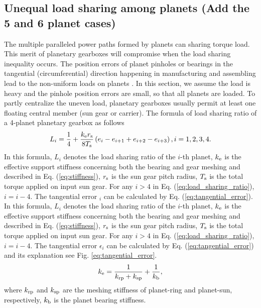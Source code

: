 \documentclass[a4paper,fleqn]{cas-sc}%
\begin{document}
\subsection{Unequal load sharing among planets (Add the 5 and 6 planet cases)}
\par The multiple paralleled power paths formed by planets can sharing torque load. This merit of planetary gearboxes will compromise when the load sharing inequality occurs. The position errors of planet pinholes or bearings in the tangential (circumferential) direction happening in manufacturing and assembling lead to the non-uniform loads on planets \cite{Singh2010511-530}. In this section, we assume the load is heavy and the pinhole position errors are small, so that all planets are loaded. To partly centralize the uneven load, planetary gearboxes usually permit at least one floating central member (sun gear or carrier). The formula of load sharing ratio of a 4-planet planetary gearbox as follows \cite{Ligata2009}
\begin{equation}
    L_i=\frac{1}{4}+\frac{k_{\rm e} r_{\rm s}}{8 T_{\rm s}}\left(e_i-e_{i+1}+e_{i+2}-e_{i+3}\right), i=1,2,3,4. \label{eq:load_sharing_ratio}
\end{equation}
In this formula, \(L_i\) denotes the load sharing ratio of the \(i\)-th planet, \(k_{\rm e}\) is the effective support stiffness concerning both the bearing and gear meshing and described in Eq. (\ref{eq:stiffness}), \(r_{\rm s}\) is the sun gear pitch radius, \(T_{\rm s}\) is the total torque applied on input sun gear. For any \(i>4\) in Eq. (\ref{eq:load_sharing_ratio}), \(i=i-4\). The tangential error $_{i}$ can be calculated by Eq. (\ref{eq:tangential_error}).
In this formula, \(L_i\) denotes the load sharing ratio of the \(i\)-th planet, \(k_{\rm e}\) is the effective support stiffness concerning both the bearing and gear meshing and described in Eq. (\ref{eq:stiffness}), \(r_{\rm s}\) is the sun gear pitch radius, \(T_{\rm s}\) is the total torque applied on input sun gear. For any \(i>4\) in Eq. (\ref{eq:load_sharing_ratio}), \(i=i-4\). The tangential error $\epsilon_{i}$ can be calculated by Eq. (\ref{eq:tangential_error}) and its explanation see Fig. \ref{eq:tangential_error}.
\begin{equation}
    k_{\rm e}=\frac{1}{k_{\rm rp}+k_{\rm sp}}+\frac{1}{k_{\rm b}},\label{eq:stiffness}
\end{equation}
where $k_{\rm rp}$ and $k_{\rm sp}$ are the meshing stiffness of planet-ring and planet-sun, respectively, $k_{\rm b}$ is the planet bearing stiffness.
\end{document}
